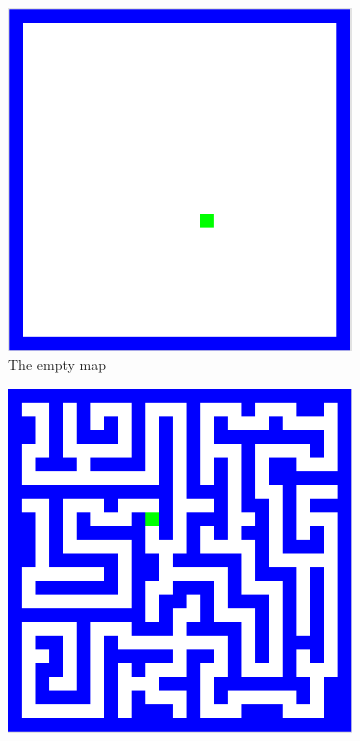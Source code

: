 \documentclass[11pt]{report}
\begin{document}
\begin{figure}
	\centering
	\begin{subfigure}[b]{0.3\textwidth}
		\includegraphics[width=\textwidth]{diagrams/emptyMap}
		\caption{The empty map}
		\label{fig:empty_map}
	\end{subfigure}
	\begin{subfigure}[b]{0.3\textwidth}
		\includegraphics[width=\textwidth]{diagrams/mazeMap}

\end{subfigure}
\end{figure}
\end{document}

